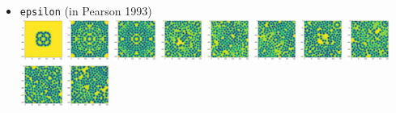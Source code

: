 \begin{itemize}
\item {\tt epsilon} (in Pearson 1993)\\
\includegraphics[width=1.4cm]{python_codes/fieldstone_171/pearson93/epsilon_solution_0001000_u}
\includegraphics[width=1.4cm]{python_codes/fieldstone_171/pearson93/epsilon_solution_0005000_u}
\includegraphics[width=1.4cm]{python_codes/fieldstone_171/pearson93/epsilon_solution_0010000_u}
\includegraphics[width=1.4cm]{python_codes/fieldstone_171/pearson93/epsilon_solution_0015000_u}
\includegraphics[width=1.4cm]{python_codes/fieldstone_171/pearson93/epsilon_solution_0020000_u}
\includegraphics[width=1.4cm]{python_codes/fieldstone_171/pearson93/epsilon_solution_0030000_u}
\includegraphics[width=1.4cm]{python_codes/fieldstone_171/pearson93/epsilon_solution_0040000_u}
\includegraphics[width=1.4cm]{python_codes/fieldstone_171/pearson93/epsilon_solution_0050000_u}
\includegraphics[width=1.4cm]{python_codes/fieldstone_171/pearson93/epsilon_solution_0075000_u}
\includegraphics[width=1.4cm]{python_codes/fieldstone_171/pearson93/epsilon_solution_final_u}


\end{itemize}
